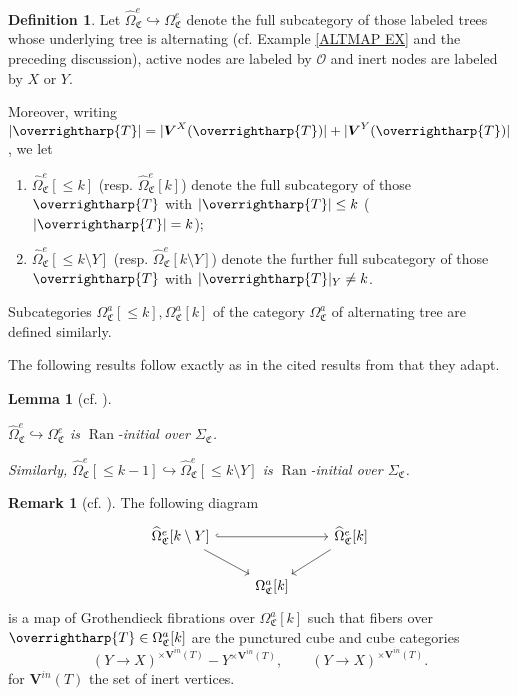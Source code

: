 \documentclass[a4paper,10pt
,draft
]{article}%
\numberwithin{equation}{section}
\numberwithin{figure}{section}
\newtheorem{lemma}[equation]{Lemma}%
\theoremstyle{definition} %
\newtheorem{definition}[equation]{Definition}%
\newtheorem{remark}[equation]{Remark}%
\newcommand{\into}{\hookrightarrow}%
\newcommand{\vect}[1]{\text{\overrightharp{\ensuremath{#1}}}}
\DeclareMathOperator{\Ran}{Ran}%
\renewcommand{\O}{\ensuremath{\mathcal O}}
\newcommand{\1}{\ensuremath{\mathbbm 1}}%
\newcommand{\SC}{\Sigma_{\mathfrak C}}
\newcommand{\OC}{\Omega_{\mathfrak C}}
\begin{document}
\begin{definition}
Let
$\widehat{\Omega}_{\mathfrak C}^{e} \hookrightarrow \Omega_{\mathfrak C}^{e}$
denote the full subcategory of those labeled trees whose underlying tree is alternating
(cf. Example \ref{ALTMAP EX} and the preceding discussion),
active nodes are labeled by $\O$ 
and inert nodes are labeled by $X$ or $Y$.

Moreover, writing 
$|\vect{T}| = |\boldsymbol{V}^X(\vect{T})|+ |\boldsymbol{V}^Y(\vect{T})|$, we let
\begin{enumerate}[label=(\roman*)]
\item $\widehat{\Omega}_{\mathfrak C}^{e}[\leq k]$ (resp. $\widehat{\Omega}_{\mathfrak C}^{e}[k]$)
denote the full subcategory of those $\vect{T}$ with $|\vect{T}| \leq k$ ($|\vect{T}|=k$);
\item $\widehat{\Omega}_{\mathfrak C}^{e}[\leq k \setminus Y]$ (resp. $\widehat{\Omega}_{\mathfrak C}^{e}[k \setminus Y]$)
denote the further full subcategory of those $\vect{T}$ with $|\vect{T}|_Y \neq k$.
\end{enumerate}
Subcategories $\OC^a[\leq k], \OC^a[k]$ of the category $\OC^a$
of alternating tree are defined similarly.
\end{definition}

The following results follow exactly as in the cited results from 
\cite{BP_geo} that they adapt.

\begin{lemma}[{cf. \cite[Cor. 5.53, Lemma 5.58]{BP_geo}}]
\label{LANINT LEM}

	$\widehat\Omega_{\mathfrak C}^e \into 
	\Omega_{\mathfrak C}^e$
	is $\Ran$-initial over $\SC$.
     
	Similarly, $\widehat\Omega_{\mathfrak C}^e[\leq k-1] \into 
\widehat\Omega_{\mathfrak C}^e[\leq k \setminus Y]$
	is $\Ran$-initial over $\SC$.
\end{lemma}

\begin{remark}[{cf. \cite[Remark 5.57]{BP_geo}}]
      \label{OEFIB REM}
      The following diagram
      \begin{equation}
            \begin{tikzcd}
                  \widehat\Omega_{\mathfrak C}^e[k \setminus Y] \arrow[rr, hookrightarrow] \arrow[dr]
                  &&
                  \widehat\Omega_{\mathfrak C}^e[k] \arrow[dl]
                  \\
                  &
                  \Omega_{\mathfrak C}^a[k]
            \end{tikzcd}
      \end{equation}
	is a map of Grothendieck fibrations over $\Omega_{\mathfrak C}^a[k]$
	such that fibers over $\vect{T} \in \Omega_{\mathfrak C}^a[k]$ are the punctured cube and cube categories
\begin{equation}
	(Y \to X)^{\times \boldsymbol{V}^{in}(T)} - Y^{\times \boldsymbol{V}^{in}(T)},
\qquad
	(Y \to X)^{\times \boldsymbol{V}^{in}(T)}.
\end{equation}
	for $\boldsymbol{V}^{in}(T)$ the set of inert vertices.
\end{remark}
\end{document}
